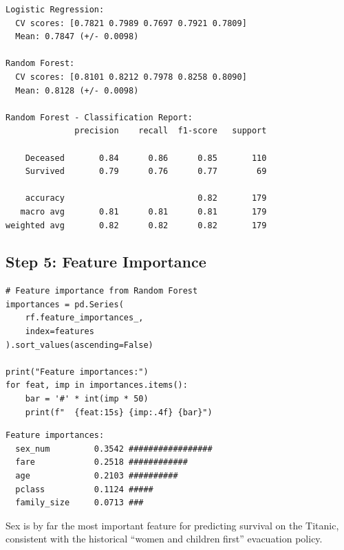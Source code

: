 \begin{codeoutput}
\begin{verbatim}
Logistic Regression:
  CV scores: [0.7821 0.7989 0.7697 0.7921 0.7809]
  Mean: 0.7847 (+/- 0.0098)

Random Forest:
  CV scores: [0.8101 0.8212 0.7978 0.8258 0.8090]
  Mean: 0.8128 (+/- 0.0098)

Random Forest - Classification Report:
              precision    recall  f1-score   support

    Deceased       0.84      0.86      0.85       110
    Survived       0.79      0.76      0.77        69

    accuracy                           0.82       179
   macro avg       0.81      0.81      0.81       179
weighted avg       0.82      0.82      0.82       179
\end{verbatim}
\end{codeoutput}

\subsection{Step 5: Feature Importance}


\begin{codeblock}[title=\textbf{Python}]
\begin{verbatim}
# Feature importance from Random Forest
importances = pd.Series(
    rf.feature_importances_,
    index=features
).sort_values(ascending=False)

print("Feature importances:")
for feat, imp in importances.items():
    bar = '#' * int(imp * 50)
    print(f"  {feat:15s} {imp:.4f} {bar}")
\end{verbatim}
\end{codeblock}

\begin{codeoutput}
\begin{verbatim}
Feature importances:
  sex_num         0.3542 #################
  fare            0.2518 ############
  age             0.2103 ##########
  pclass          0.1124 #####
  family_size     0.0713 ###
\end{verbatim}
\end{codeoutput}

\begin{remark}
Sex is by far the most important feature for predicting survival on the Titanic, consistent with the historical ``women and children first'' evacuation policy.
\end{remark}


